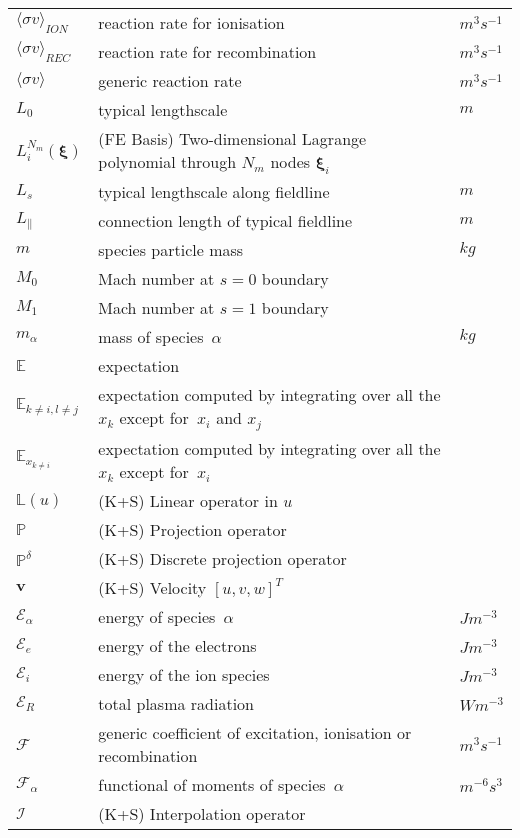 \begin{longtable}{|p{3.0cm}|p{10.0cm}|p{3.0cm}|}
$\langle \sigma v \rangle_{ION}$ & reaction rate for ionisation  & $m^3 s^{-1}$ \\
$\langle \sigma v \rangle_{REC}$ & reaction rate for recombination  & $m^3 s^{-1}$ \\
$\langle\sigma v\rangle$ & generic reaction rate  & $m^3 s^{-1}$ \\
$L_0$ & typical lengthscale  & $m$ \\
$L_i^{N_m}(\boldsymbol{\xi})$ &  (FE Basis) Two-dimensional Lagrange polynomial through $N_m$ nodes ${\mathbf \xi}_i$ & \\
$L_s$ & typical lengthscale along fieldline  & $m$ \\
$L_{\|}$ & connection length of typical fieldline  & $m$ \\
$m$ & species particle mass & $kg$ \\
$M_0$ & Mach number at $s=0$ boundary & \\
$M_1$ & Mach number at $s=1$ boundary & \\
$m_\alpha$ & mass of species~$\alpha$ & $kg$ \\
$\mathbb{E}$ & expectation  & \\
$\mathbb{E}_{k\neq i, l\neq j}$ & expectation computed by integrating over all the $x_k$ except for~$x_i$ and  $x_j$  & \\
$\mathbb{E}_{x_{k\neq i}}$ & expectation computed by integrating over all the $x_k$ except for~$x_i$  & \\
$\mathbb{L}(u)$ &  (K+S) Linear operator in $u$ & \\
$\mathbb{P}$ &  (K+S) Projection operator & \\
$\mathbb{P}^{\delta}$ &  (K+S) Discrete projection operator & \\
${\mathbf v}$ &  (K+S) Velocity $[u, v, w]^T$ & \\
$\mathcal{E}_\alpha$ & energy of species~$\alpha$ & $J m^{-3}$ \\
$\mathcal{E}_e$ & energy of the electrons & $J m^{-3}$ \\
$\mathcal{E}_i$ & energy of the ion species & $J m^{-3}$ \\
$\mathcal{E}_R$ & total plasma radiation & $W m^{-3}$ \\
$\mathcal{F}$ & generic coefficient of excitation, ionisation or recombination  & $m^3 s^{-1}$ \\
$\mathcal{F}_\alpha$ & functional of moments of species~$\alpha$  & $m^{-6} s^3$ \\
$\mathcal{I}$ &  (K+S) Interpolation operator & \\

\end{longtable}
